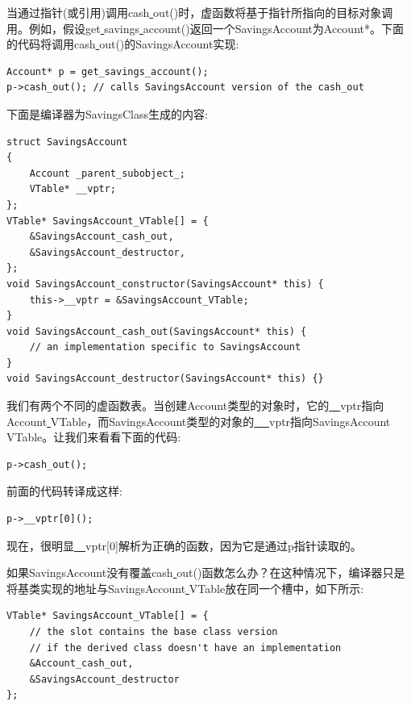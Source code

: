 当通过指针(或引用)调用cash\underline{ }out()时，虚函数将基于指针所指向的目标对象调用。例如，假设get\underline{ }savings\underline{ }account()返回一个SavingsAccount为Account*。下面的代码将调用cash\underline{ }out()的SavingsAccount实现: \par

\begin{lstlisting}[caption={}]
Account* p = get_savings_account();
p->cash_out(); // calls SavingsAccount version of the cash_out
\end{lstlisting}

下面是编译器为SavingsClass生成的内容: \par

\begin{lstlisting}[caption={}]
struct SavingsAccount
{
	Account _parent_subobject_;
	VTable* __vptr;
};
VTable* SavingsAccount_VTable[] = {
	&SavingsAccount_cash_out,
	&SavingsAccount_destructor,
};
void SavingsAccount_constructor(SavingsAccount* this) {
	this->__vptr = &SavingsAccount_VTable;
}
void SavingsAccount_cash_out(SavingsAccount* this) {
	// an implementation specific to SavingsAccount
}
void SavingsAccount_destructor(SavingsAccount* this) {}
\end{lstlisting}

我们有两个不同的虚函数表。当创建Account类型的对象时，它的\underline{~~}vptr指向Account\underline{ }VTable，而SavingsAccount类型的对象的\underline{ ~~}vptr指向SavingsAccount\underline{ }VTable。让我们来看看下面的代码: \par

\begin{lstlisting}[caption={}]
p->cash_out();
\end{lstlisting}

前面的代码转译成这样: \par

\begin{lstlisting}[caption={}]
p->__vptr[0]();
\end{lstlisting}

现在，很明显\underline{~~}vptr[0]解析为正确的函数，因为它是通过p指针读取的。\par
如果SavingsAccount没有覆盖cash\underline{ }out()函数怎么办？在这种情况下，编译器只是将基类实现的地址与SavingsAccount\underline{ }VTable放在同一个槽中，如下所示:\par

\begin{lstlisting}[caption={}]
VTable* SavingsAccount_VTable[] = {
	// the slot contains the base class version
	// if the derived class doesn't have an implementation
	&Account_cash_out,
	&SavingsAccount_destructor
};
\end{lstlisting}

